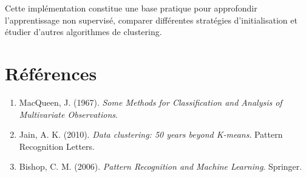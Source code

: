 \documentclass[12pt,a4paper]{article}
\begin{document}
Cette implémentation constitue une base pratique pour approfondir l'apprentissage non supervisé, comparer différentes stratégies d'initialisation et étudier d'autres algorithmes de clustering.

\section*{Références}

\begin{enumerate}
    \item MacQueen, J. (1967). \textit{Some Methods for Classification and Analysis of Multivariate Observations}.
    \item Jain, A. K. (2010). \textit{Data clustering: 50 years beyond K-means}. Pattern Recognition Letters.
    \item Bishop, C. M. (2006). \textit{Pattern Recognition and Machine Learning}. Springer.
\end{enumerate}
\end{document}
